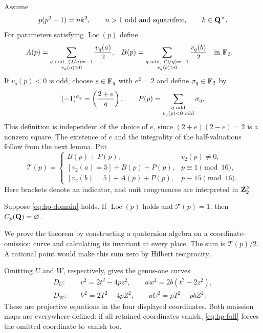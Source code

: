 Assume
\begin{equation}\label{eq:hp-domain}
 p(p^2-1)=nk^2,\qquad n>1\text{ odd and squarefree},\qquad k\in\mathbf Q^\times.
\end{equation}
For parameters satisfying $\operatorname{Loc}(p)$ define
\begin{align}
 A(p)&=\sum_{\substack{q\text{ odd},\ (2/q)=-1\\v_q(a)>0}}\frac{v_q(a)}2,
 &B(p)&=\sum_{\substack{q\text{ odd},\ (2/q)=-1\\v_q(b)>0}}\frac{v_q(b)}2
 \quad\text{in }\F_2.\label{eq:hp-AB}
\end{align}
If $v_q(p)<0$ is odd, choose $e\in\mathbf F_q$ with $e^2=2$ and define
$\sigma_q\in\mathbf F_2$ by
\[
 (-1)^{\sigma_q}=\left(\frac{2+e}{q}\right),\qquad
 P(p)=\sum_{\substack{q\text{ odd}\\v_q(p)<0\text{ odd}}}\sigma_q.
\]
This definition is independent of the choice of $e$, since
$(2+e)(2-e)=2$ is a nonzero square.  The existence of $e$ and the
integrality of the half-valuations follow from the next lemma.
Put
\begin{equation}\label{eq:hp-parity}
 \mathcal T(p)=
 \begin{cases}
 B(p)+P(p),&v_2(p)\ne0,\\
 [v_2(a)=5]+B(p)+P(p),&p\equiv1\pmod {16},\\
 [v_2(b)=5]+A(p)+P(p),&p\equiv15\pmod {16}.
 \end{cases}
\end{equation}
Here brackets denote an indicator, and unit congruences are interpreted
in $\mathbf Z_2^\times$.

\begin{theorem}\label{thm:hp-uniform}
Suppose \eqref{eq:hp-domain} holds.  If $\operatorname{Loc}(p)$ holds
and $\mathcal T(p)=1$, then $C_p(\mathbf Q)=\varnothing$.
\end{theorem}

We prove the theorem by constructing a quaternion algebra on a
coordinate-omission curve and calculating its invariant at every place.
The sum is $\mathcal T(p)/2$.  A rational point would make this sum zero
by Hilbert reciprocity.

Omitting $U$ and $W$, respectively, gives the genus-one curves
\begin{align}
 D_U:&\quad v^2=2t^2-4pz^2,\qquad
 aw^2=2b(t^2-2z^2),\label{eq:hp-DU}\\
 D_W:&\quad V^2=2T^2-4pZ^2,\qquad
 aU^2=pT^2-pbZ^2.\label{eq:hp-DW}
\end{align}
These are projective equations in the four displayed coordinates.
Both omission maps are everywhere defined: if all retained coordinates
vanish, \eqref{eq:hp-full} forces the omitted coordinate to vanish too.

